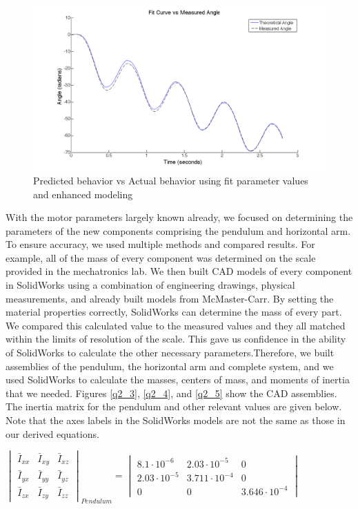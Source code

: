 \documentclass{article}
\theoremstyle{plain}
\theoremstyle{definition}
\theoremstyle{remark}
\begin{document}
\begin{figure}[htb]
\begin{center}
\includegraphics[width = 14cm]{awesomefitFiner.png}
\caption{Predicted behavior vs Actual behavior using fit parameter values and enhanced modeling}
\label{q2_2}
\end{center}
\end{figure}

With the motor parameters largely known already, we focused on determining the parameters of the new components comprising the pendulum and horizontal arm. To ensure accuracy, we used multiple methods and compared results. For example, all of the mass of every component was determined on the scale provided in the mechatronics lab. We then built CAD models of every component in SolidWorks using a combination of engineering drawings, physical measurements, and already built models from McMaster-Carr. By setting the material properties correctly, SolidWorks can determine the mass of every part. We compared this calculated value to the measured values and they all matched within the limits of resolution of the scale. This gave us confidence in the ability of SolidWorks to calculate the other necessary parameters.Therefore, we built assemblies of the pendulum, the horizontal arm and complete system, and we used SolidWorks to calculate the masses, centers of mass, and moments of inertia that we needed. Figures \ref{q2_3}, \ref{q2_4}, and \ref{q2_5} show the CAD assemblies. The inertia matrix for the pendulum and other relevant values are given below. Note that the axes labels in the SolidWorks models are not the same as those in our derived equations.

\begin{center} $ \begin{vmatrix}
\bar{I}_{xx} & \bar{I}_{xy} & \bar{I}_{xz} \\
\bar{I}_{yx} & \bar{I}_{yy} & \bar{I}_{yz} \\
\bar{I}_{zx} & \bar{I}_{zy} &  \bar{I}_{zz} \end{vmatrix}_{Pendulum}
=  \begin{vmatrix}
8.1\cdot10^{-6} & 2.03\cdot10^{-5} & 0 \\
2.03\cdot10^{-5} & 3.711\cdot10^{-4} & 0 \\
0 & 0 &  3.646\cdot10^{-4} \end{vmatrix}$\end{center}
\end{document}
